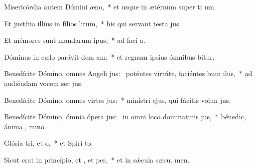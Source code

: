 \item Misericórdia autem Dómini  æno,~* et usque in ætérnum super ti um.
\item Et justítia illíus in fílios lirum,~* his qui servant testa jus.
\item Et mémores sunt mandarum ipus,~* ad faci a.
\item Dóminus in cælo parávit dem am:~* et regnum ipsíus ómnibus bitur.
\item Benedícite Dómino, omnes Angeli jus:~\pscross{} poténtes virtúte, faciéntes bum ilus,~* ad audiéndam vocem ser jus.
\item Benedícite Dómino, omnes virtes jus:~* minístri ejus, qui fácitis volun jus.
\item Benedícite Dómino, ómnia ópera jus:~\pscross{} in omni loco dominatinis jus,~* bénedic, ánima , mino.
\item Glória tri, et o,~* et Spirí to.
\item Sicut erat in princípio, et , et per,~* et in sǽcula sæcu. men.
